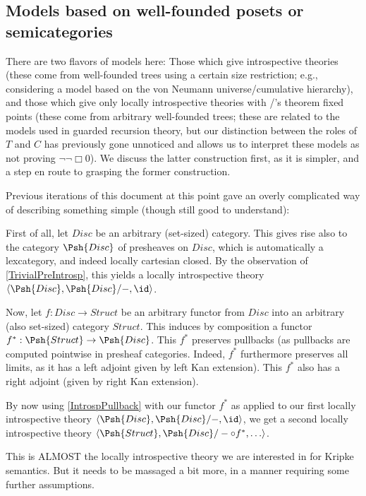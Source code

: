 \subsection{Models based on well-founded posets or semicategories}
There are two flavors of models here: Those which give introspective theories (these come from well-founded trees using a certain size restriction; e.g., considering a model based on the von Neumann universe/cumulative hierarchy), and those which give only locally introspective theories with \Loeb/'s theorem fixed points (these come from arbitrary well-founded trees; these are related to the models used in guarded recursion theory, but our distinction between the roles of $T$ and $C$ has previously gone unnoticed and allows us to interpret these models as not proving $\lnot \lnot \Box 0$). We discuss the latter construction first, as it is simpler, and a step en route to grasping the former construction.

Previous iterations of this document at this point gave an overly complicated way of describing something simple (though still good to understand):

First of all, let $Disc$ be an arbitrary (set-sized) category. This gives rise also to the category $\Psh{Disc}$ of presheaves on $Disc$, which is automatically a lexcategory, and indeed locally cartesian closed. By the observation of \cref{TrivialPreIntrosp}, this yields a locally introspective theory $\langle \Psh{Disc}, \Psh{Disc}/-, \id \rangle$.

Now, let $f : Disc \to Struct$ be an arbitrary functor from $Disc$ into an arbitrary (also set-sized) category $Struct$. This induces by composition a functor $f^* : \Psh{Struct} \to \Psh{Disc}$. This $f^*$ preserves pullbacks (as pullbacks are computed pointwise in presheaf categories. Indeed, $f^*$ furthermore preserves all limits, as it has a left adjoint given by left Kan extension). This $f^*$ also has a right adjoint (given by right Kan extension).


By now using \cref{IntrospPullback} with our functor $f^*$ as applied to our first locally introspective theory $\langle \Psh{Disc}, \Psh{Disc}/-, \id \rangle$, we get a second locally introspective theory $\langle \Psh{Struct}, \Psh{Disc}/- \circ f^*, \ldots \rangle$.

This is ALMOST the locally introspective theory we are interested in for Kripke semantics. But it needs to be massaged a bit more, in a manner requiring some further assumptions. 

